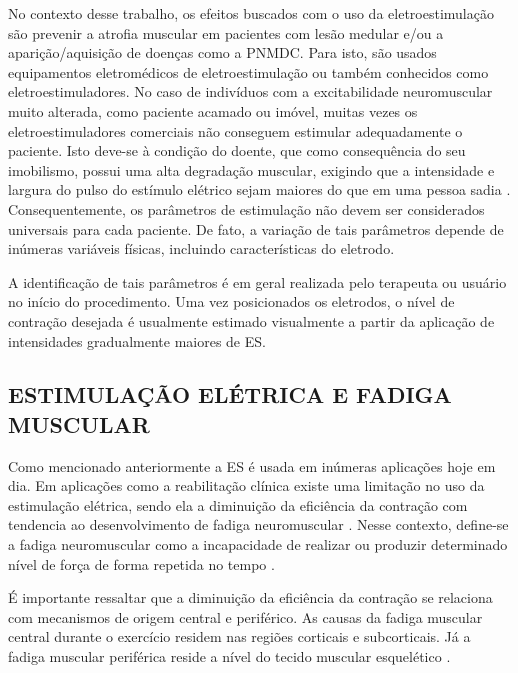 No contexto desse trabalho, os efeitos buscados com o uso da eletroestimulação são prevenir a atrofia muscular em pacientes com lesão medular e/ou a aparição/aquisição de doenças como a \acrshort{PNMDC}. Para isto, são usados equipamentos eletromédicos de eletroestimulação ou também conhecidos como eletroestimuladores. 
No caso de indivíduos com a excitabilidade neuromuscular muito alterada, como paciente acamado ou imóvel, muitas vezes os eletroestimuladores comerciais não conseguem estimular adequadamente o paciente. Isto deve-se à condição do doente, que como consequência do seu imobilismo, possui uma alta degradação muscular, exigindo que a intensidade e largura do pulso do estímulo elétrico sejam maiores do que em uma pessoa sadia \cite{Paulo2007}. Consequentemente, os parâmetros de estimulação não devem ser considerados universais para cada paciente. De fato, a variação de tais parâmetros depende de inúmeras variáveis físicas, incluindo características do eletrodo. 

A identificação de tais parâmetros é em geral realizada pelo terapeuta ou usuário no início do procedimento. Uma vez posicionados os eletrodos, o nível de contração desejada é usualmente estimado visualmente a partir da aplicação de intensidades gradualmente maiores de \acrshort{ES}. 


\subsection{ESTIMULAÇÃO ELÉTRICA E FADIGA MUSCULAR}

Como mencionado anteriormente a \acrshort{ES} é usada em inúmeras aplicações hoje em dia. Em aplicações como a reabilitação clínica existe uma limitação no uso da estimulação elétrica, sendo ela a diminuição da eficiência da contração com tendencia ao desenvolvimento de fadiga neuromuscular \cite{DeOliveira2018}.
Nesse contexto, define-se a fadiga neuromuscular como a incapacidade de realizar ou produzir determinado nível de força de forma repetida no tempo \cite{Ascensao2003}.

É importante ressaltar que a diminuição da eficiência da contração se relaciona com mecanismos de origem central e periférico. As causas da fadiga muscular central durante o exercício residem nas regiões corticais e subcorticais. Já a fadiga muscular periférica reside a nível do tecido muscular esquelético \cite{Ascensao2003}. 

